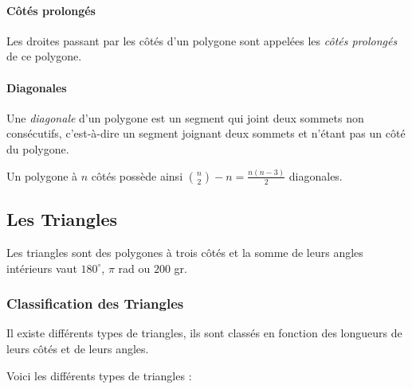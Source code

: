 \documentclass[a4paper, twoside]{article}
\begin{document}
\paragraph*{Côtés prolongés}

Les droites passant par les côtés d'un polygone sont appelées
les \emph{côtés prolongés} de ce polygone.


\paragraph*{Diagonales}

Une \emph{diagonale} d'un polygone est un segment qui joint deux sommets non consécutifs,
c'est-à-dire un segment joignant deux sommets et n'étant pas un côté du polygone.

Un polygone à $n$ côtés possède ainsi $\binom{n}{2} - n = \frac{n(n-3)}{2}$ diagonales.

\newpage

\subsection{Les Triangles} \label{triangles}

Les triangles sont des polygones à trois côtés et la somme de leurs angles
intérieurs vaut $180^\circ$, $\pi$ rad ou $200$ gr.

\subsubsection{Classification des Triangles}

Il existe différents types de triangles,
ils sont classés en fonction des longueurs de leurs côtés et de leurs angles.

\medbreak

Voici les différents types de triangles :

\medbreak
\end{document}
